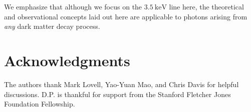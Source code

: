 \documentclass[aps,prd,10pt,twocolumn,superscriptaddress,showpacs]{revtex4-1}
\newcommand{\units}[1]{~\mathrm{#1}}
\begin{document}
We emphasize that although we focus on the $3.5\units{keV}$ line here, the theoretical and
observational concepts laid out here are applicable to photons arising from \emph{any} dark matter
decay process. 

 
\vspace{-0.5 cm}
	

\section*{Acknowledgments} 

The authors thank Mark Lovell, Yao-Yuan Mao, and Chris Davis for helpful discussions. D.P. is
thankful for support from the Stanford Fletcher Jones Foundation Fellowship.


\newcommand{\mnras}[0]{M.N.R.A.S.}
%
%	
	
\end{document}
